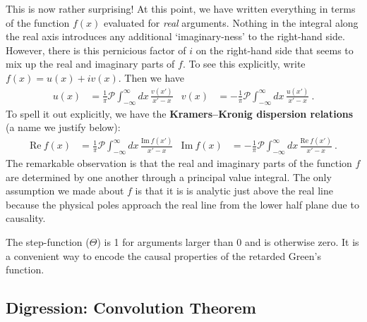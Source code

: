 This is now rather surprising! At this point, we have written everything in terms of the function $f(x)$ evaluated for \emph{real} arguments. Nothing in the integral along the real axis introduces any additional `imaginary-ness' to the right-hand side. However, there is this pernicious factor of $i$ on the right-hand side that seems to mix up the real and imaginary parts of $f$. To see this explicitly, write $f(x) = u(x) + i v(x)$. Then we have
\begin{align}
	u(x) &= \frac{1}{\pi}
	\mathcal P \int_{-\infty}^\infty dx 
		\, \frac{v(x')}{x'-x} 
		&
	v(x) &= -\frac{1}{\pi}
	\mathcal P \int_{-\infty}^\infty dx 
		\, \frac{u(x')}{x'-x} 
	\ .
\end{align}
To spell it out explicitly, we have the \textbf{Kramers--Kronig dispersion relations} (a name we justify below):
\begin{align}
	\text{Re}~f(x) &= \frac{1}{\pi}
	\mathcal P \int_{-\infty}^\infty dx 
		\, \frac{\text{Im}~f(x')}{x'-x} 
		&
	\text{Im}~f(x) &= -\frac{1}{\pi}
	\mathcal P \int_{-\infty}^\infty dx 
		\, \frac{\text{Re}~f(x')}{x'-x} 
	\ .
	\label{eq:KK:Cauchy:relations}
\end{align}
The remarkable observation is that the real and imaginary parts of the function $f$ are determined by one another through a principal value integral. The only assumption we made about $f$ is that it is is analytic just above the real line because the physical poles approach the real line from the lower half plane due to causality.

\begin{example}
The step-function ($\Theta$) is 1 for arguments larger than 0 and is otherwise zero. It is a convenient way to encode the causal properties of the retarded Green's function. 
\end{example}

\subsection{Digression: Convolution Theorem}
\label{sec:convolution:theorem}


